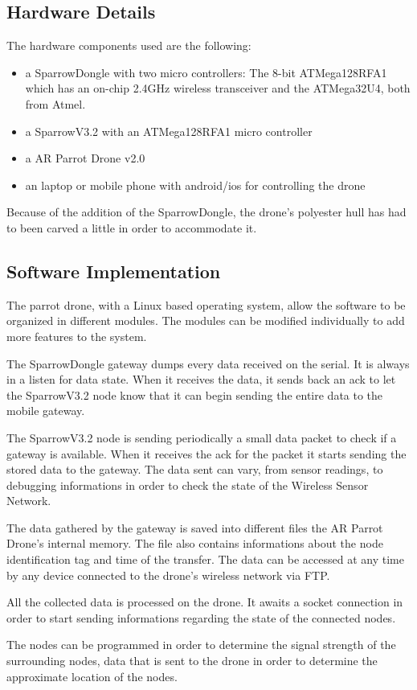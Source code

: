 \label{chap:impl}

 \subsection{Hardware Details}

The hardware components used are the following:
\begin{itemize}

\item a SparrowDongle with two micro controllers: The 8-bit ATMega128RFA1 which has an on-chip 2.4GHz wireless transceiver and the ATMega32U4, both from Atmel.

\item a SparrowV3.2  with an ATMega128RFA1 micro controller 

\item a AR Parrot Drone v2.0

\item an laptop or mobile phone with android/ios for controlling the drone

\end{itemize}

Because of the addition of the SparrowDongle, the drone's polyester hull has had to been carved a little in order to accommodate it.
 

\subsection{Software Implementation}

The parrot drone, with a Linux based operating system, allow the software to be organized in different modules. The modules can be modified individually  to add more features to the system.

The SparrowDongle gateway dumps every data received on the serial. It is always in a listen for data state. When it receives the data, it sends back an ack to let the SparrowV3.2 node know that it can begin sending the entire data to the mobile gateway. 

The SparrowV3.2 node is sending periodically a small data packet to check if a gateway is available. When it receives the ack for the packet it starts sending the stored data to the gateway. The data sent can vary, from sensor readings, to debugging informations in order to check the state of the Wireless Sensor Network.

The data gathered by the gateway is saved into different files the AR Parrot Drone's internal memory. The file also contains informations about the node identification tag and time of the transfer. The data can be accessed at any time by any device connected to the drone's wireless network via FTP.

All the collected data is processed on the drone. It awaits a socket connection in order to start sending informations regarding the state of the connected nodes.

The nodes can be programmed in order to determine the signal strength of the surrounding nodes, data that is sent to the drone in order to determine the approximate location of the nodes\cite{savarese2001location}.


